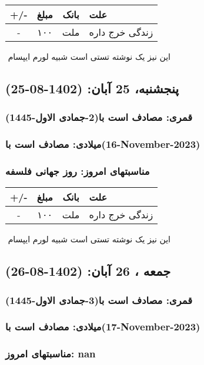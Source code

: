 \documentclass{article}
\newcommand{\rnote}[1]{\marginpar{\textcolor{color}{\StrSubstitute{\##1}{ }{\_}}}}
\newcommand{\myRow}[4]{
    #1 & #2 & #3 & #4 \\ \hline
}
\begin{document}
\begin{tabular}{ | c | c | c | p{5cm} |}
    \hline
    \myRow{ +/- }{مبلغ}{بانک}{علت}
    \myRow{-}{۱۰۰}{ملت}{زندگی خرج داره}
\end{tabular}
\newline
\newline

‌
\rnote{تست}
این نیز یک نوشته تستی است شبیه لورم ایپسام




\newpage
{}
\textcolor{color}{
\section{ پنجشنبه، 25 آبان: (1402-08-25) }
\subsubsection*{قمری: مصادف است با(2-جمادی الاول-1445)} 
\subsubsection*{میلادی: مصادف است با(16-November-2023)}
\subsubsection*{مناسبتهای امروز: روز جهانی فلسفه}
}


\begin{tabular}{ | c | c | c | p{5cm} |}
    \hline
    \myRow{ +/- }{مبلغ}{بانک}{علت}
    \myRow{-}{۱۰۰}{ملت}{زندگی خرج داره}
\end{tabular}
\newline
\newline

‌
\rnote{تست}
این نیز یک نوشته تستی است شبیه لورم ایپسام




\newpage
{}
\textcolor{color}{
\section{ جمعه ، 26 آبان: (1402-08-26) }
\subsubsection*{قمری: مصادف است با(3-جمادی الاول-1445)} 
\subsubsection*{میلادی: مصادف است با(17-November-2023)}
\subsubsection*{مناسبتهای امروز: nan}
}
\end{document}
